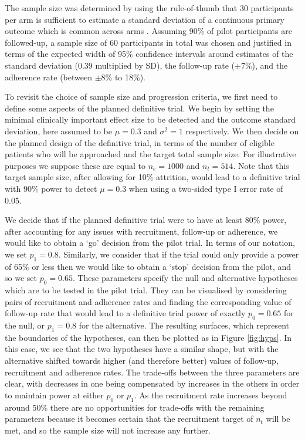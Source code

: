 \documentclass[AMA,STIX1COL]{WileyNJD-v2}
\begin{document}
The sample size was determined by using the rule-of-thumb that 30 participants per arm is sufficient to estimate a standard deviation of a continuous primary outcome which is common across arms \cite{Lancaster2004}. Assuming 90\% of pilot participants are followed-up, a sample size of 60 participants in total was chosen and justified in terms of the expected width of 95\% confidence intervals around estimates of the standard deviation (0.39 multiplied by SD), the follow-up rate ($\pm 7$\%), and the adherence rate (between $\pm 8$\% to 18\%).

To revisit the choice of sample size and progression criteria, we first need to define some aspects of the planned definitive trial. We begin by setting the minimal clinically important effect size to be detected and the outcome standard deviation, here assumed to be $\mu = 0.3$ and $\sigma^2 = 1$ respectively. We then decide on the planned design of the definitive trial, in terms of the number of eligible patients who will be approached and the target total sample size. For illustrative purposes we suppose these are equal to $n_e = 1000$ and $n_t = 514$. Note that this target sample size, after allowing for 10\% attrition, would lead to a definitive trial with 90\% power to detect $\mu=0.3$ when using a two-sided type I error rate of 0.05.

We decide that if the planned definitive trial were to have at least 80\% power, after accounting for any issues with recruitment, follow-up or adherence, we would like to obtain a `go' decision from the pilot trial. In terms of our notation, we set $p_1 = 0.8$. Similarly, we consider that if the trial could only provide a power of 65\% or less then we would like to obtain a `stop' decision from the pilot, and so we set $p_0 = 0.65$. These parameters specify the null and alternative hypotheses which are to be tested in the pilot trial. They can be visualised by considering pairs of recruitment and adherence rates and finding the corresponding value of follow-up rate that would lead to a definitive trial power of exactly $p_0 = 0.65$ for the null, or $p_1 = 0.8$ for the alternative. The resulting surfaces, which represent the boundaries of the hypotheses, can then be plotted as in Figure \ref{fig:hyps}. In this case, we see that the two hypotheses have a similar shape, but with the alternative shifted towards higher (and therefore better) values of follow-up, recruitment and adherence rates. The trade-offs between the three parameters are clear, with decreases in one being compensated by increases in the others in order to maintain power at either $p_0$ or $p_1$. As the recruitment rate increases beyond around 50\% there are no opportunities for trade-offs with the remaining parameters because it becomes certain that the recruitment target of $n_t$ will be met, and so the sample size will not increase any further.
\end{document}
